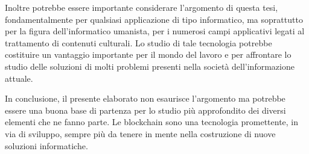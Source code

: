 Inoltre potrebbe essere importante considerare l'argomento di questa tesi, fondamentalmente per qualsiasi applicazione di tipo informatico, ma soprattutto per la figura dell'informatico umanista, per i numerosi campi applicativi legati al trattamento di contenuti culturali. Lo studio di tale tecnologia potrebbe costituire un vantaggio importante per il mondo del lavoro e per affrontare lo studio delle soluzioni di molti problemi presenti nella società dell’informazione attuale.

In conclusione, il presente elaborato non esaurisce l’argomento ma potrebbe essere una buona base di partenza per lo studio più approfondito dei diversi elementi che ne fanno parte. Le blockchain sono una tecnologia promettente, in via di sviluppo, sempre più da tenere in mente nella costruzione di nuove soluzioni informatiche.